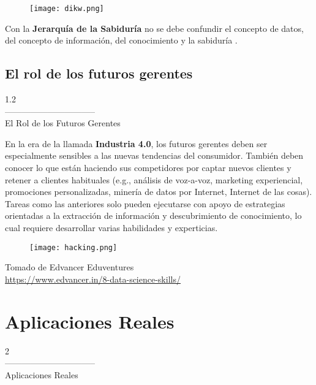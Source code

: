 \documentclass[aspectratio=169]{beamer}
\begin{document}
\begin{frame}
\begin{figure}
\centering
 \texttt{[image: dikw.png]}
\end{figure}
Con la \textbf{Jerarquía de la Sabiduría} no se debe confundir el concepto de datos, del concepto de información, del conocimiento y la sabiduría \cite{Zins2007}.
\end{frame}

\subsection{El rol de los futuros gerentes}
\begin{frame}
\begin{center}
\Huge
\textcolor{azulcesaclaro}{1.2\\
--------------------------------\\
El Rol de los Futuros Gerentes}
\end{center}
\end{frame}

\begin{frame}
En la era de la llamada \textbf{Industria 4.0}, los futuros gerentes deben ser especialmente sensibles a las nuevas tendencias del consumidor. También deben conocer lo que están haciendo sus competidores por captar nuevos clientes y retener a clientes habituales (e.g., análisis de voz-a-voz, marketing experiencial, promociones personalizadas, minería de datos por Internet, Internet de las cosas).  \\
\vspace{0.5cm}
Tareas como las anteriores solo pueden ejecutarse con apoyo de estrategias orientadas a la extracción de información y descubrimiento de conocimiento, lo cual requiere desarrollar varias habilidades y experticias.
\end{frame}

\begin{frame}
\centering
\begin{figure}
\centering
 \texttt{[image: hacking.png]}
\end{figure}
Tomado de Edvancer Eduventures\\ \textcolor{blue}{\url{https://www.edvancer.in/8-data-science-skills/}}
\end{frame}

\section{Aplicaciones Reales}
\begin{frame}
\begin{center}
\Huge
\textcolor{azulcesaclaro}{2\\
--------------------------------\\
Aplicaciones Reales}
\end{center}
\end{frame}
\end{document}
